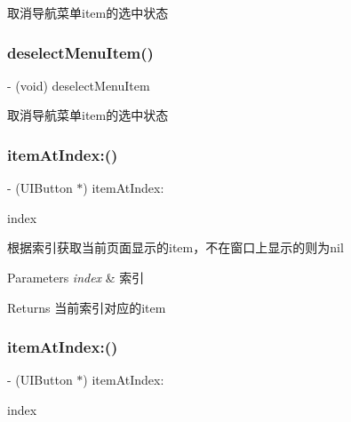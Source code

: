 取消导航菜单item的选中状态 \mbox{\label{interface_v_t_menu_bar_a8539552ebb1885de47bad0ee12416c18}} 
\subsubsection{\texorpdfstring{deselect\+Menu\+Item()}{deselectMenuItem()}\hspace{0.1cm}{\footnotesize\ttfamily [3/3]}}
{\footnotesize\ttfamily -\/ (void) deselect\+Menu\+Item \begin{DoxyParamCaption}{ }\end{DoxyParamCaption}}

取消导航菜单item的选中状态 \mbox{\label{interface_v_t_menu_bar_a99f0f75a9516d06886df6c33e487b6e4}} 
\subsubsection{\texorpdfstring{item\+At\+Index\+:()}{itemAtIndex:()}\hspace{0.1cm}{\footnotesize\ttfamily [1/3]}}
{\footnotesize\ttfamily -\/ (U\+I\+Button $\ast$) item\+At\+Index\+: \begin{DoxyParamCaption}\item[{(N\+S\+U\+Integer)}]{index }\end{DoxyParamCaption}}

根据索引获取当前页面显示的item，不在窗口上显示的则为nil


\begin{DoxyParams}{Parameters}
{\em index} & 索引\\
\hline
\end{DoxyParams}
\begin{DoxyReturn}{Returns}
当前索引对应的item 
\end{DoxyReturn}
\mbox{\label{interface_v_t_menu_bar_a99f0f75a9516d06886df6c33e487b6e4}} 
\subsubsection{\texorpdfstring{item\+At\+Index\+:()}{itemAtIndex:()}\hspace{0.1cm}{\footnotesize\ttfamily [2/3]}}
{\footnotesize\ttfamily -\/ (U\+I\+Button $\ast$) item\+At\+Index\+: \begin{DoxyParamCaption}\item[{(N\+S\+U\+Integer)}]{index }\end{DoxyParamCaption}}


